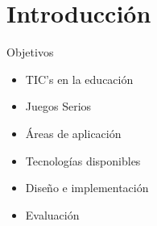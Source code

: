 \section{Introducción}
\setcounter{sectiontotal}{1}

\begin{frame}{Objetivos}
\pause{}
	\begin{itemize}[<+->]
	\item TIC's en la educación
	\item Juegos Serios
	\item Áreas de aplicación
	\item Tecnologías disponibles
	\item Diseño e implementación
	\item Evaluación 
	\end{itemize}
\end{frame}

